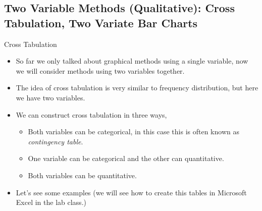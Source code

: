 \documentclass[8pt, usepdftitle=false]{beamer}
\begin{document}
\subsection{Two Variable Methods (Qualitative): Cross Tabulation, Two Variate Bar Charts}
\frame{\subsectionpage}


\begin{frame}[allowframebreaks]{Cross Tabulation}

\begin{itemize}

  \item So far we only talked about graphical methods using a single variable, now we will consider methods using two variables together.

  \item The idea of cross tabulation is very similar to frequency distribution, but here we have two variables. 

  \item We can construct cross tabulation in three ways,

  \begin{itemize}
    \item Both variables can be categorical, in this case this is often known as \emph{contingency table}.

    \item One variable can be categorical and the other can quantitative.

    \item Both variables can be quantitative.
  \end{itemize}


\item Let's see some examples (we will see how to create this tables in Microsoft Excel in the lab class.)


\end{itemize}
  
\end{frame}
\end{document}

